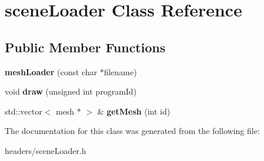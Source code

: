 \hypertarget{classscene_loader}{\section{scene\+Loader Class Reference}
\label{classscene_loader}
}
\subsection*{Public Member Functions}
\begin{DoxyCompactItemize}
\item 
\hypertarget{classscene_loader_a625bf389bccfa11be0137ab625840fdb}{{\bfseries mesh\+Loader} (const char $\ast$filename)}\label{classscene_loader_a625bf389bccfa11be0137ab625840fdb}

\item 
\hypertarget{classscene_loader_a584d7ea9fa69fda72b19be530b8dc969}{void {\bfseries draw} (unsigned int program\+Id)}\label{classscene_loader_a584d7ea9fa69fda72b19be530b8dc969}

\item 
\hypertarget{classscene_loader_a430c76062710245f0bed68694b56ae9d}{std\+::vector$<$ mesh $\ast$ $>$ \& {\bfseries get\+Mesh} (int id)}\label{classscene_loader_a430c76062710245f0bed68694b56ae9d}

\end{DoxyCompactItemize}


The documentation for this class was generated from the following file\+:\begin{DoxyCompactItemize}
\item 
headers/scene\+Loader.\+h\end{DoxyCompactItemize}
